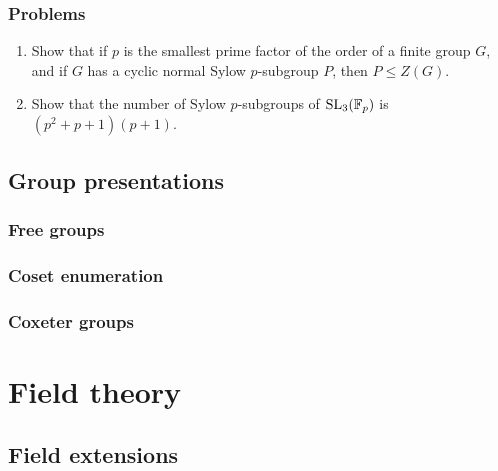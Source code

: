 \documentclass{../../large}
\begin{document}
\section*{Problems}
\begin{enumerate}
\item Show that if $p$ is the smallest prime factor of the order of a finite group $G$, and if $G$ has a cyclic normal Sylow $p$-subgroup $P$, then $P\le Z(G)$.
\item Show that the number of Sylow $p$-subgroups of $\mathrm{SL}_3(\mathbb{F}_p)$ is $(p^2+p+1)(p+1)$.
\end{enumerate}











\chapter{Group presentations}

\section{Free groups}

\section{Coset enumeration}
\begin{prb}
\end{prb}
\begin{prb}
\end{prb}
\begin{prb}
\end{prb}

\section{Coxeter groups}









\part{Field theory}

\chapter{Field extensions}
\end{document}
